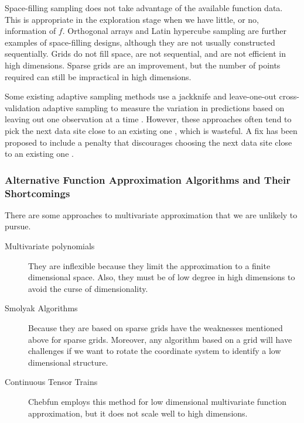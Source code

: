 \documentclass[11pt]{NSFamsart}
\begin{document}
Space-filling sampling does not take advantage of the available function data.  This is appropriate in the exploration stage when we have little, or no, information of $f$.
Orthogonal arrays and Latin hypercube sampling are further examples of space-filling designs, although they are not usually constructed sequentially. Grids do not fill space, are not sequential, and are not efficient in high dimensions.  Sparse grids \cite{BunGrie04a} are an improvement, but the number of points required can still be impractical in high dimensions.  

Some existing adaptive sampling methods use a jackknife and leave-one-out cross-validation adaptive sampling to measure the variation in predictions based on leaving out one observation at a time \cite{aute2013cross,jin2002sequential, kleijnen2004application}. However, these approaches often tend to pick the next data site close to an existing one \cite{jin2002sequential}, which is wasteful. A fix has been proposed to include a penalty that discourages choosing the next data site close to an existing one \cite{aute2013cross,jin2002sequential}.

\subsubsection{Alternative Function Approximation Algorithms and Their Shortcomings} \label{sec:shortAlgo}

There are some approaches to multivariate approximation that we are unlikely to pursue.  
\begin{description}
	\item[Multivariate polynomials] They are inflexible because they limit the approximation to a finite dimensional space.  Also, they must be of low degree in high dimensions to avoid the curse of dimensionality.
	\item[Smolyak Algorithms \cite{BunGrie04a}] Because they are based on sparse grids have the weaknesses mentioned above for sparse grids.  Moreover, any algorithm based on a grid will have challenges if we want to rotate the coordinate system to identify a low dimensional structure.
	\item[Continuous Tensor Trains \cite{GorKarMar19a}] Chebfun \cite{DriHalTre14a} employs this method for low dimensional multivariate function approximation, but it does not scale well to high dimensions.
\end{description}
\end{document}
